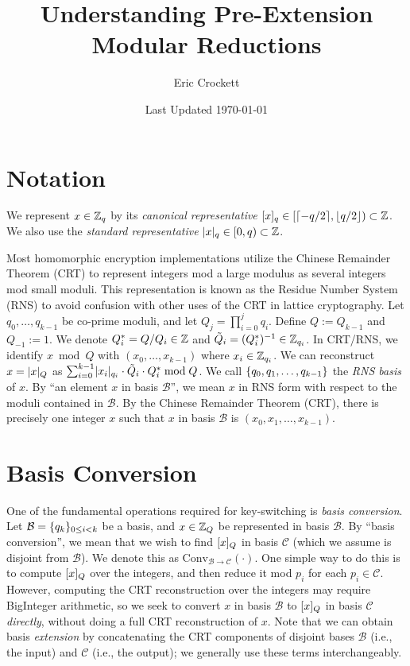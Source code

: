 \documentclass{article}
\title{Understanding Pre-Extension Modular Reductions}
\author{Eric Crockett}
\date{Last Updated \today}
\begin{document}
    \maketitle	
    \listoffixmes
    
\section{Notation}
We represent $x\in \mathbb{Z}_q$ by its \emph{canonical representative} $[x]_q\in[\lceil-q/2\rceil,\lfloor q/2\rfloor)\subset\mathbb{Z}$. We also use the \emph{standard representative} $\lvert x\rvert_q\in[0,q)\subset \mathbb{Z}$.

Most homomorphic encryption implementations utilize the Chinese Remainder Theorem (CRT) to represent integers mod a large modulus as several integers mod small moduli. This representation is known as the Residue Number System (RNS) to avoid confusion with other uses of the CRT in lattice cryptography. Let $q_0, \ldots, q_{k-1}$ be co-prime moduli, and let $Q_j=\prod_{i=0}^j q_i$. Define $Q:=Q_{k-1}$ and $Q_{-1}:=1$. We denote $Q^*_i=Q/Q_i\in \mathbb{Z}$ and $\tilde{Q}_i=(Q^*_i)^{-1}\in\mathbb{Z}_{q_i}$. In CRT/RNS, we identify $x\bmod Q$ with $(x_0, \ldots, x_{k-1})$ where $x_i\in\mathbb{Z}_{q_i}$. 
We can reconstruct $x=\lvert x\rvert_Q$ as $\sum_{i=0}^{k-1}\lvert x_i\rvert_{q_i}\cdot\tilde{Q}_i\cdot Q^*_i\bmod Q$. We call $\{q_0, q_1, \ldots, q_{k-1}\}$ the \emph{RNS basis} of $x$. By ``an element $x$ in basis $\mathcal{B}$'', we mean $x$ in RNS form with respect to the moduli contained in $\mathcal{B}$. By the Chinese Remainder Theorem (CRT), there is precisely one integer $x$ such that $x$ in basis $\mathcal{B}$ is $(x_0, x_1, \ldots, x_{k-1})$.

\section{Basis Conversion}
One of the fundamental operations required for key-switching is \emph{basis conversion}. Let $\mathcal{B}=\{q_k\}_{0\le i<k}$ be a basis, and $x\in \mathbb{Z}_Q$ be represented in basis $\mathcal{B}$. By ``basis conversion'', we mean that we wish to find $[x]_Q$ in basis $\mathcal{C}$ (which we assume is disjoint from $\mathcal{B}$). We denote this as $\mathrm{Conv}_{\mathcal{B}\rightarrow\mathcal{C}}(\cdot)$. One simple way to do this is to compute $[x]_Q$ over the integers, and then reduce it mod $p_i$ for each $p_i\in\mathcal{C}$. However, computing the CRT reconstruction over the integers may require BigInteger arithmetic, so we seek to convert $x$ in basis $\mathcal{B}$ to $[x]_Q$ in basis $\mathcal{C}$ \emph{directly}, without doing a full CRT reconstruction of $x$. Note that we can obtain basis \emph{extension} by concatenating the CRT components of disjoint bases $\mathcal{B}$ (i.e., the input) and $\mathcal{C}$ (i.e., the output); we generally use these terms interchangeably.
\end{document}
